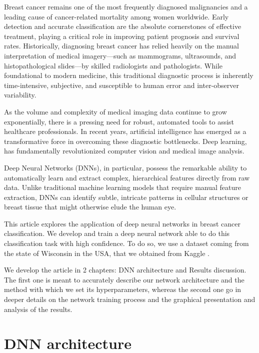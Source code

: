 \documentclass[prl,twocolumn]{revtex4-2}
\begin{document}
Breast cancer remains one of the most frequently diagnosed malignancies and a leading cause of cancer-related mortality among women worldwide. Early detection and accurate classification are the absolute cornerstones of effective treatment, playing a critical role in improving patient prognosis and survival rates. Historically, diagnosing breast cancer has relied heavily on the manual interpretation of medical imagery—such as mammograms, ultrasounds, and histopathological slides—by skilled radiologists and pathologists. While foundational to modern medicine, this traditional diagnostic process is inherently time-intensive, subjective, and susceptible to human error and inter-observer variability.
\par
As the volume and complexity of medical imaging data continue to grow exponentially, there is a pressing need for robust, automated tools to assist healthcare professionals. In recent years, artificial intelligence has emerged as a transformative force in overcoming these diagnostic bottlenecks. Deep learning, has fundamentally revolutionized computer vision and medical image analysis.
\par
Deep Neural Networks (DNNs), in particular, possess the remarkable ability to automatically learn and extract complex, hierarchical features directly from raw data. Unlike traditional machine learning models that require manual feature extraction, DNNs can identify subtle, intricate patterns in cellular structures or breast tissue that might otherwise elude the human eye.
\par
This article explores the application of deep neural networks in breast cancer classification. 
We develop and train a deep neural network able to do this classification task with high confidence. To do so, we use a dataset coming from the state of Wisconsin in the USA, that we obtained from Kaggle \cite{kaggle_breast_cancer} \cite{wolberg1995}. 
\par
We develop the article in 2 chapters: DNN architecture and Results discussion. The first one is meant to accurately describe our network architecture and the method with which we set its hyperparameters, whereas the second one go in deeper details on the network training process and the graphical presentation and analysis of the results. 

\section{DNN architecture}
\end{document}
